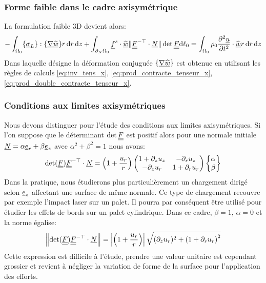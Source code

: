 \documentclass[10pt]{book}
\newcommand{\dlo}{\d\ell_{0}}
\begin{document}
\subsubsection{Forme faible dans le cadre axisymétrique}
La formulation faible 3D devient alors:
$$-\int_{\Configuration_{0}}\{\vec{\sigma}_{L}\}:\{\vec{\nabla}\DepVirt\}r\dr\dz+\int_{\dNOm_{0}}\FSurf\cdot\DepVirt\Vert\GT^{-\top}\cdot\NormaleInit\Vert\det\GT\dlo=\int_{\Configuration_{0}}\rho_{0}\dfrac{\partial^{2}\Dep}{\partial t^{2}}\cdot\DepVirt r\dr\dz$$
Dans laquelle désigne la déformation conjuguée $\{\underline{\nabla}\widehat{\underline{w}}\}$ est obtenue en utilisant les règles de calculs \eqref{eq:inv_tens_x}, \eqref{eq:prod_contracte_tenseur_x}, \eqref{eq:prod_double_contracte_tenseur_x}.
\subsubsection{Conditions aux limites axisymétriques}
Nous devons distinguer pour l'étude des conditions aux limites axisymétriques. Si l'on suppose que le déterminant $\det\underline{\underline{F}}$ est positif alors pour une normale initiale $\underline{N}=\alpha\underline{e}_{r}+\beta\underline{e}_{z}$ avec $\alpha^{2}+\beta^{2}=1$ nous avons: 
$$\det(\underline{\underline{F}})\underline{\underline{F}}^{-\top}\cdot\underline{N}=\left(1+\frac{u_{r}}{r}\right)\begin{pmatrix}
1+\partial_{z}u_{z} & -\partial_{r}u_{z}\\
 -\partial_{z}u_{r}& 1+\partial_{r}u_{r}
\end{pmatrix}\begin{Bmatrix}
\alpha\\
\beta\end{Bmatrix}$$
Dans la pratique, nous étudierons plus particulièrement un chargement dirigé selon $\underline{e}_{z}$ affectant une surface de même normale. Ce type de chargement recouvre par exemple l'impact laser sur un palet. Il pourra par conséquent être utilisé pour étudier les effets de bords sur un palet cylindrique. Dans ce cadre, $\beta=1$, $\alpha=0$ et la norme égalise:
$$\left\Vert\det(\underline{\underline{F}})\underline{\underline{F}}^{-\top}\cdot\underline{N}\right\Vert=\left|\left(1+\frac{u_{r}}{r}\right)\right|\sqrt{(\partial_{z}u_{r})^{2}+\left(1+\partial_{r}u_{r}\right)^{2}}$$
Cette expression est difficile à l'étude, prendre une valeur unitaire est cependant grossier et revient à négliger la variation de forme de la surface pour l'application des efforts.
\end{document}
